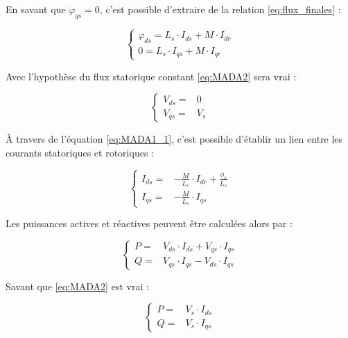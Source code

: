 En savant que $\varphi_{qs} = 0$, c'est possible d'extraire de la relation \ref{eq:flux_finales} :

\begin{equation}
    \left\{
    \begin{aligned}
        \varphi_{ds} = L_s \cdot I_{ds} + M \cdot I_{dr} \\
        0 = L_s \cdot I_{qs} + M \cdot I_{qr}
    \end{aligned}
    \right.
    \label{eq:MADA1_1}
\end{equation}


Avec l'hypothèse du flux statorique constant \ref{eq:MADA2} sera vrai : 

\begin{equation}
    \left\{
    \begin{aligned}
        V_{ds} =& 0 \\
        V_{qs} =& V_s
    \end{aligned}
    \right.
    \label{eq:MADA2}
\end{equation}

À travers de l'équation \ref{eq:MADA1_1}, c'est possible d'établir un lien  entre les courants statoriques et rotoriques :

\begin{equation}
    \left\{
    \begin{aligned}
        I_{ds} =& -\frac{M}{L_s} \cdot I_{dr} + \frac{\phi_s}{L_s} \\
        I_{qs} =& -\frac{M}{L_s} \cdot I_{qs}
    \end{aligned}
    \right.
    \label{eq:MADA3}
\end{equation}

Les puissances actives et réactives peuvent être calculées alors par :

\begin{equation}
    \left\{
    \begin{aligned}
        P =& V_{ds} \cdot I_{ds} + V_{qs} \cdot I_{qs} \\
        Q =& V_{qs} \cdot I_{qs} - V_{ds} \cdot I_{qs}
    \end{aligned}
    \right.
    \label{eq:MADA4}
\end{equation}

Savant que \ref{eq:MADA2} est vrai :


\begin{equation}
    \left\{
    \begin{aligned}
        P =& V_{s} \cdot I_{ds} \\
        Q =& V_{s} \cdot I_{qs} 
    \end{aligned}
    \right.
    \label{eq:MADA5}
\end{equation}

